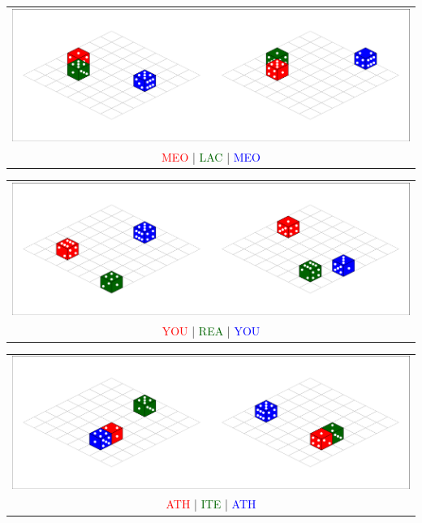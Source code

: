   \newpage


  \begin{center}
    \begin{tabular}{c}
      \includegraphics[width=0.8\linewidth]{diceGreen02.png}
      \\
      \textcolor{red}{MEO} |
      \textcolor{darkGreen}{LAC} |
      \textcolor{blue}{MEO}
    \end{tabular}
  \end{center}


  \vfill


  \begin{center}
    \begin{tabular}{c}
      \includegraphics[width=0.8\linewidth]{diceGreen01.png}
      \\
      \textcolor{red}{YOU} |
      \textcolor{darkGreen}{REA} |
      \textcolor{blue}{YOU}
    \end{tabular}
  \end{center}


  \vfill


  \begin{center}
    \begin{tabular}{c}
      \includegraphics[width=0.8\linewidth]{diceGreen03.png}
      \\
      \textcolor{red}{ATH} |
      \textcolor{darkGreen}{ITE} |
      \textcolor{blue}{ATH}
    \end{tabular}
  \end{center}


